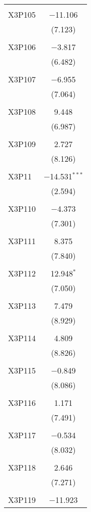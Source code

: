 \begin{table}[!htbp]
\begin{tabular}{@{\extracolsep{5pt}}lc}
  & \\ 
 X3P105 & $-$11.106 \\ 
  & (7.123) \\ 
  & \\ 
 X3P106 & $-$3.817 \\ 
  & (6.482) \\ 
  & \\ 
 X3P107 & $-$6.955 \\ 
  & (7.064) \\ 
  & \\ 
 X3P108 & 9.448 \\ 
  & (6.987) \\ 
  & \\ 
 X3P109 & 2.727 \\ 
  & (8.126) \\ 
  & \\ 
 X3P11 & $-$14.531$^{***}$ \\ 
  & (2.594) \\ 
  & \\ 
 X3P110 & $-$4.373 \\ 
  & (7.301) \\ 
  & \\ 
 X3P111 & 8.375 \\ 
  & (7.840) \\ 
  & \\ 
 X3P112 & 12.948$^{*}$ \\ 
  & (7.050) \\ 
  & \\ 
 X3P113 & 7.479 \\ 
  & (8.929) \\ 
  & \\ 
 X3P114 & 4.809 \\ 
  & (8.826) \\ 
  & \\ 
 X3P115 & $-$0.849 \\ 
  & (8.086) \\ 
  & \\ 
 X3P116 & 1.171 \\ 
  & (7.491) \\ 
  & \\ 
 X3P117 & $-$0.534 \\ 
  & (8.032) \\ 
  & \\ 
 X3P118 & 2.646 \\ 
  & (7.271) \\ 
  & \\ 
 X3P119 & $-$11.923 \\ 

\end{tabular}
\end{table}
